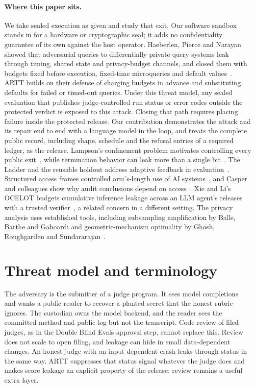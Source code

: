 \documentclass[10pt,twocolumn]{article}
\begin{document}
\paragraph{Where this paper sits.} We take sealed execution as given and study that exit. Our software sandbox stands in for a hardware or cryptographic seal; it adds no confidentiality guarantee of its own against the host operator. Haeberlen, Pierce and Narayan showed that adversarial queries to differentially private query systems leak through timing, shared state and privacy-budget channels, and closed them with budgets fixed before execution, fixed-time microqueries and default values~\cite{haeberlen}. ARTT builds on their defense of charging budgets in advance and substituting defaults for failed or timed-out queries. Under this threat model, any sealed evaluation that publishes judge-controlled run status or error codes outside the protected verdict is exposed to this attack. Closing that path requires placing failure inside the protected release. Our contribution demonstrates the attack and its repair end to end with a language model in the loop, and treats the complete public record, including shape, schedule and the refusal entries of a required ledger, as the release. Lampson's confinement problem motivates controlling every public exit~\cite{lampson}, while termination behavior can leak more than a single bit~\cite{askarov}. The Ladder and the reusable holdout address adaptive feedback in evaluation~\cite{blumhardt,dwork}. Structured access frames controlled arm's-length use of AI systems~\cite{shevlane}, and Casper and colleagues show why audit conclusions depend on access~\cite{casper}. Xie and Li's OCELOT budgets cumulative inference leakage across an LLM agent's releases with a trusted verifier~\cite{ocelot}, a related concern in a different setting. The privacy analysis uses established tools, including subsampling amplification by Balle, Barthe and Gaboardi and geometric-mechanism optimality by Ghosh, Roughgarden and Sundararajan~\cite{balle,ghosh}.

\section{Threat model and terminology}\label{sec:threat-model}

The adversary is the submitter of a judge program. It sees model completions and wants a public reader to recover a planted secret that the honest rubric ignores. The custodian owns the model backend, and the reader sees the committed method and public log but not the transcript. Code review of filed judges, as in the Double Blind Evals approval step, cannot replace this. Review does not scale to open filing, and leakage can hide in small data-dependent changes. An honest judge with an input-dependent crash leaks through status in the same way. ARTT suppresses that status signal whatever the judge does and makes score leakage an explicit property of the release; review remains a useful extra layer.
\end{document}
